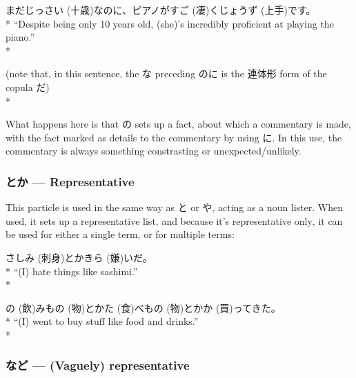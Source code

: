 \documentclass[11pt, b5paper, twoside, openright, onecolumn]{book}
\makeatletter
\newcommand*{\rubystack}[2]{{\relscale{0.5}%
  \begin{tabular}[b]{@{}c@{}}%
    {#1}\\%
   {\textscale{2}{#2}}%
  \end{tabular}}%
}
\DeclareRobustCommand*{\ruby}[2]{%
  \mbox{%
    \setlength{\parskip}{0ex}%
    \BeginAccSupp{method=pdfstringdef,ActualText={#1}}%
      \rubystack{\phantom{#2}}{#1}%
      \llap{%
        \rubystack{#2}{\phantom{#1}}%
      }%
    \EndAccSupp{}%
  }%
}
\renewcommand*{\ruby}[2]{#2 (#1)}%
\newenvironment{exampleblock}{
\setlength{\parindent}{0.6in}
\begin{minipage}[t]{\dimexpr\textwidth-\parindent}}
{\end{minipage}}
\makeatother
\begin{document}
\vspace{0.4cm}
\begin{exampleblock}
まだ\ruby{十歳}{じっさい}なのに、ピアノが\ruby{凄}{すご}く\ruby{上手}{じょうず}です。 \\* 
“Despite being only 10 years old‚ (she)’s incredibly proficient at playing the piano.” \\* 
\end{exampleblock}
\vspace{0.2cm}

\begin{exampleblock}
(note that‚ in this sentence‚ the な preceding のに is the 連体形 form of the copula だ) \\* 
\end{exampleblock}
\vspace{0.2cm}

What happens here is that の sets up a fact‚ about which a commentary is made‚ with the fact marked as details to the commentary by using に. In this use‚ the commentary is always something constrasting or unexpected/unlikely.

\subsubsection{とか — Representative}

This particle is used in the same way as と or や‚ acting as a noun lister. When used‚ it sets up a representative list‚ and because it’s representative only‚ it can be used for either a single term‚ or for multiple terms:

\vspace{0.4cm}
\begin{exampleblock}
\ruby{刺身}{さしみ}とか\ruby{嫌}{きら}いだ。 \\* 
“(I) hate things like sashimi.” \\* 
\end{exampleblock}
\vspace{0.2cm}

\begin{exampleblock}
\ruby{飲}{の}み\ruby{物}{もの}とか\ruby{食}{た}べ\ruby{物}{もの}とか\ruby{買}{か}ってきた。 \\* 
“(I) went to buy stuff like food and drinks.” \\* 
\end{exampleblock}
\subsubsection{など — (Vaguely) representative}
\end{document}
